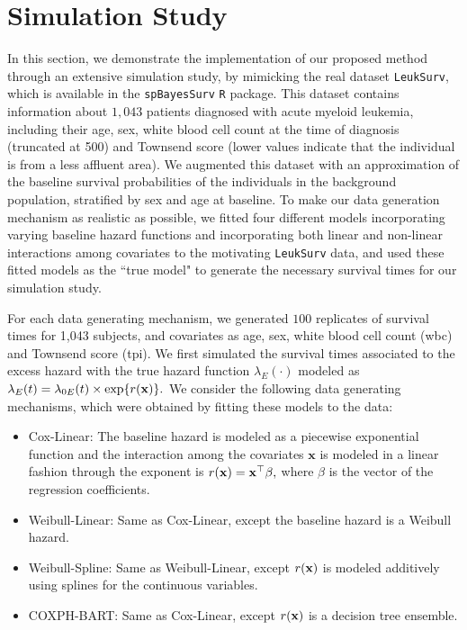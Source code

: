 \documentclass[12pt]{article}
\newcommand{\bfx}{{\bf x}}
\begin{document}
\section{Simulation Study}\label{sec:simulation}


In this section, we demonstrate the implementation of our proposed method through an extensive simulation study, by mimicking the real dataset \texttt{LeukSurv}, which is available in the \texttt{spBayesSurv} \texttt{R} package. This dataset contains information about $1,043$ patients diagnosed with acute myeloid leukemia, including their age, sex, white blood cell count at the time of diagnosis (truncated at 500) and Townsend score (lower values indicate that the individual is from a less affluent area). We augmented this dataset with an approximation of the baseline survival probabilities of the individuals in the background population, stratified by sex and age at baseline. To make our data generation mechanism as realistic as possible, we fitted four different models incorporating varying baseline hazard functions and incorporating both linear and non-linear  interactions among covariates to the motivating \texttt{LeukSurv} data, and used these fitted models as the ``true model" to generate the necessary survival times for our simulation study.

For each data generating mechanism, we generated $100$ replicates of survival times for 1,043 subjects, and covariates as age, sex, white blood cell count (wbc) and Townsend score (tpi). We first simulated the survival times associated to the excess hazard with the true hazard function $\lambda_E(\cdot)$ modeled as 
\begin{math}
  \lambda_E(t) = \lambda_{0E}(t)\times \exp\{r(\bfx)\}.
\end{math}
We consider the following data generating mechanisms, which were obtained by fitting these models to the data:
\begin{itemize}
    \item Cox-Linear: The baseline hazard is modeled as a piecewise exponential function and the interaction among the covariates $\mathbf{x}$ is modeled in a linear fashion through the exponent is $r(\bfx) = \bfx^{\top}\beta,$ where  $\beta$ is the vector of the regression coefficients.
    
    \item Weibull-Linear: Same as Cox-Linear, except the baseline hazard is a Weibull hazard.
    
    \item Weibull-Spline: Same as Weibull-Linear, except $r(\bfx)$ is modeled additively using splines for the continuous variables.
    
    \item COXPH-BART: Same as Cox-Linear, except $r(\bfx)$ is a decision tree ensemble.
\end{itemize}
\end{document}
